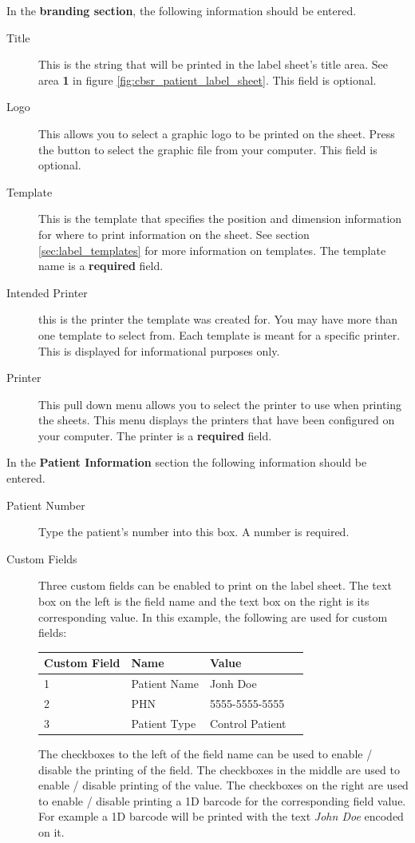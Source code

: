 In the \textbf{branding section}, the following information should be entered.

\begin{description}
\item[Title] This is the string that will be printed in the label sheet's title
  area. See area \textbf{1} in figure \ref{fig:cbsr_patient_label_sheet}. This field
  is optional.
\item[Logo] This allows you to select a graphic logo to be printed on the
  sheet. Press the  button to select the graphic file from your
  computer. This field is optional.
\item[Template] This is the template that specifies the position and dimension
  information for where to print information on the sheet. See section
  \ref{sec:label_templates} for more information on templates. The template
  name is a \textbf{required} field.
\item[Intended Printer] this is the printer the template was created for. You
  may have more than one template to select from. Each template is meant for a
  specific printer. This is displayed for informational purposes only.
\item[Printer] This pull down menu allows you to select the printer to use when
  printing the sheets. This menu displays the printers that have been
  configured on your computer. The printer is a \textbf{required} field.
\end{description}

In the \textbf{Patient Information} section the following information should be
entered.

\begin{description}
\item[Patient Number] Type the patient's number into this box. A number is required.
\item[Custom Fields] Three custom fields can be enabled to print on the
  label sheet. The text box on the left is the field name and the text box on
  the right is its corresponding value. In this example, the following are used
  for custom fields:

  \begin{center}
    \begin{tabular}{ | l | l | l | p{5cm} |}
      \hline
      Custom Field & Name & Value \\ \hline
      1 & Patient Name & Jonh Doe \\ \hline
      2 & PHN & 5555-5555-5555 \\ \hline
      3 & Patient Type & Control Patient \\
      \hline
    \end{tabular}
  \end{center}

  The checkboxes to the left of the field name can be used to enable / disable
  the printing of the field. The checkboxes in the middle are used to enable /
  disable printing of the value. The checkboxes on the right are used to enable
  / disable printing a 1D barcode for the corresponding field value. For
  example a 1D barcode will be printed with the text \emph{John Doe} encoded on
  it.
\end{description}

